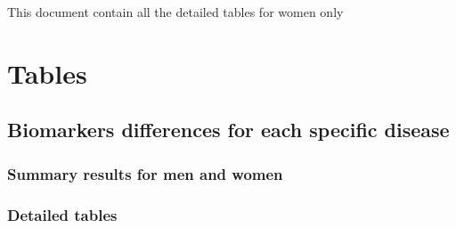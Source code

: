 \documentclass[10pt, a4paper, onecolumn]{article} %
\begin{document}
\listoffigures
\listoftables
\newpage


This document contain all the detailed tables for women only

\section{Tables}

\subsection{Biomarkers differences for each specific disease}

\subsubsection{Summary results for men and women}



\subsubsection{Detailed tables}


















\end{document}
